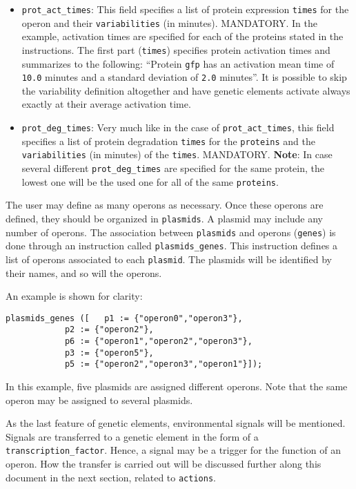 \documentclass[10pt,a4paper]{article}
\begin{document}
\begin{itemize}
\begin{itemize}
		\end{itemize}
	\item \texttt{prot\_act\_times}: This field specifies a list of protein expression \texttt{times} for the operon and their \texttt{variabilities} (in minutes). MANDATORY. In the example, activation times are specified for each of the proteins stated in the instructions. The first part (\texttt{times}) specifies protein activation times and summarizes to the following: ``Protein \texttt{gfp} has an activation mean time of \texttt{10.0} minutes and a standard deviation of \texttt{2.0} minutes''. It is possible to skip the variability definition altogether and have genetic elements activate always exactly at their average activation time.
	\item \texttt{prot\_deg\_times}: Very much like in the case of \texttt{prot\_act\_times}, this field specifies a list of protein degradation \texttt{times} for the \texttt{proteins} and the  \texttt{variabilities} (in minutes) of the \texttt{times}. MANDATORY. \textbf{Note}: In case several different \texttt{prot\_deg\_times} are specified for the same protein, the lowest one will be the used one for all of the same \texttt{proteins}.	
\end{itemize}

The user may define as many operons as necessary. Once these operons are defined, they should be organized in \texttt{plasmids}. A plasmid may include any number of operons. The association between \texttt{plasmids} and operons (\texttt{genes}) is done through an instruction called \texttt{plasmids\_genes}. This instruction defines a list of operons associated to each \texttt{plasmid}. The plasmids will be identified by their names, and so will the operons. \newline

An example is shown for clarity:

\begin{Verbatim}[obeytabs]
plasmids_genes ([	p1 := {"operon0","operon3"},
			p2 := {"operon2"},
			p6 := {"operon1","operon2","operon3"},
			p3 := {"operon5"},
			p5 := {"operon2","operon3","operon1"}]);
\end{Verbatim}

In this example, five plasmids are assigned different operons. Note that the same operon may be assigned to several plasmids. \newline

As the last feature of genetic elements, environmental signals will be mentioned. Signals are transferred to a genetic element in the form of a \texttt{transcription\_factor}. Hence, a signal may be a trigger for the function of an operon. How the transfer is carried out will be discussed further along this document in the next section, related to \texttt{actions}. \newpage
\end{document}
